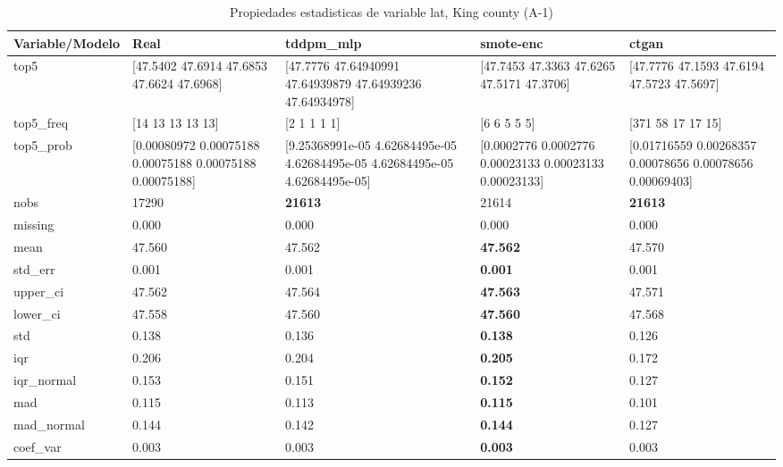 \begin{table}[H]
\centering
\fontsize{8}{14}\selectfont
\caption{Propiedades  estadisticas de variable lat, King county (A-1)}
\label{table-stats-king county-a-1-lat}
\begin{tabular}{|l|m{10em}|m{10em}|m{10em}|m{10em}|}
\hline
 \rowcolor[gray]{0.8}
Variable/Modelo & Real & tddpm\_mlp & smote-enc & ctgan \\
\hline top5 & [47.5402 47.6914 47.6853 47.6624 47.6968] & [47.7776     47.64940991 47.64939879 47.64939236 47.64934978] & [47.7453 47.3363 47.6265 47.5171 47.3706] & [47.7776 47.1593 47.6194 47.5723 47.5697] \\
\hline top5\_freq & [14 13 13 13 13] & [2 1 1 1 1] & [6 6 5 5 5] & [371  58  17  17  15] \\
\hline top5\_prob & [0.00080972 0.00075188 0.00075188 0.00075188 0.00075188] & [9.25368991e-05 4.62684495e-05 4.62684495e-05 4.62684495e-05
 4.62684495e-05] & [0.0002776  0.0002776  0.00023133 0.00023133 0.00023133] & [0.01716559 0.00268357 0.00078656 0.00078656 0.00069403] \\
\hline nobs & 17290 & \bfseries 21613 & \cellcolor[rgb]{0.9, 0.54, 0.52} 21614 & \bfseries 21613 \\
\hline missing & 0.000 & 0.000 & 0.000 & 0.000 \\
\hline mean & 47.560 & 47.562 & \bfseries 47.562 & \cellcolor[rgb]{0.9, 0.54, 0.52} 47.570 \\
\hline std\_err & 0.001 & 0.001 & \bfseries 0.001 & \cellcolor[rgb]{0.9, 0.54, 0.52} 0.001 \\
\hline upper\_ci & 47.562 & 47.564 & \bfseries 47.563 & \cellcolor[rgb]{0.9, 0.54, 0.52} 47.571 \\
\hline lower\_ci & 47.558 & 47.560 & \bfseries 47.560 & \cellcolor[rgb]{0.9, 0.54, 0.52} 47.568 \\
\hline std & 0.138 & 0.136 & \bfseries 0.138 & \cellcolor[rgb]{0.9, 0.54, 0.52} 0.126 \\
\hline iqr & 0.206 & 0.204 & \bfseries 0.205 & \cellcolor[rgb]{0.9, 0.54, 0.52} 0.172 \\
\hline iqr\_normal & 0.153 & 0.151 & \bfseries 0.152 & \cellcolor[rgb]{0.9, 0.54, 0.52} 0.127 \\
\hline mad & 0.115 & 0.113 & \bfseries 0.115 & \cellcolor[rgb]{0.9, 0.54, 0.52} 0.101 \\
\hline mad\_normal & 0.144 & 0.142 & \bfseries 0.144 & \cellcolor[rgb]{0.9, 0.54, 0.52} 0.127 \\
\hline coef\_var & 0.003 & 0.003 & \bfseries 0.003 & \cellcolor[rgb]{0.9, 0.54, 0.52} 0.003 \\

\end{tabular}
\end{table}
